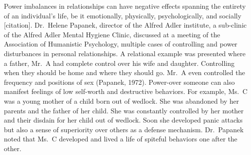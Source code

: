 \documentclass[
  donotrepeattitle,doc, 12pt, a4paper,floatsintext]{apa7}
\begin{document}
Power imbalances in relationships can have negative effects spanning the entirety of an individual's life, be it emotionally, physically, psychologically, and socially {[}citation{]}. Dr.~Helene Papanek, director of the Alfred Adler institute, a sub-clinic of the Alfred Adler Mental Hygiene Clinic, discussed at a meeting of the Association of Humanistic Psychology, multiple cases of controlling and power disturbances in personal relationships. A relational example was presented where a father, Mr.~A had complete control over his wife and daughter. Controlling when they should be home and where they should go. Mr.~A even controlled the frequency and positions of sex (Papanek, 1972). Power-over someone can also manifest feelings of low self-worth and destructive behaviors. For example, Ms.~C was a young mother of a child born out of wedlock. She was abandoned by her parents and the father of her child. She was constantly controlled by her mother and their disdain for her child out of wedlock. Soon she developed panic attacks but also a sense of superiority over others as a defense mechanism. Dr.~Papanek noted that Ms.~C developed and lived a life of spiteful behaviors one after the other.
\end{document}
